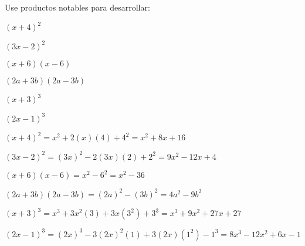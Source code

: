 \begin{exercise}
\problem Use productos notables para desarrollar:

\begin{exerciselist}
    \item $(x + 4)^2$
    \item $(3x - 2)^2$
    \item $(x + 6)(x - 6)$
    \item $(2a + 3b)(2a - 3b)$
    \item $(x + 3)^3$
    \item $(2x - 1)^3$
\end{exerciselist}

\begin{solucion}
\begin{exerciselist}
    \item $(x + 4)^2 = x^2 + 2(x)(4) + 4^2 = x^2 + 8x + 16$
    
    \item $(3x - 2)^2 = (3x)^2 - 2(3x)(2) + 2^2 = 9x^2 - 12x + 4$
    
    \item $(x + 6)(x - 6) = x^2 - 6^2 = x^2 - 36$
    
    \item $(2a + 3b)(2a - 3b) = (2a)^2 - (3b)^2 = 4a^2 - 9b^2$
    
    \item $(x + 3)^3 = x^3 + 3x^2(3) + 3x(3^2) + 3^3 = x^3 + 9x^2 + 27x + 27$
    
    \item $(2x - 1)^3 = (2x)^3 - 3(2x)^2(1) + 3(2x)(1^2) - 1^3 = 8x^3 - 12x^2 + 6x - 1$
\end{exerciselist}
\end{solucion}
\end{exercise}

